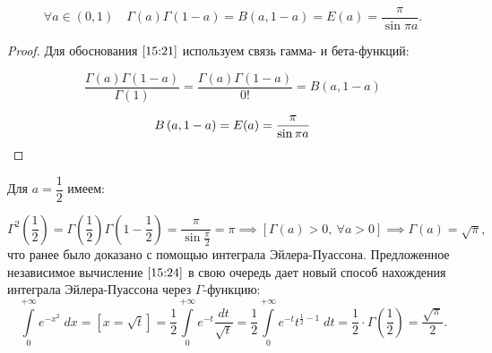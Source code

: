 \documentclass[../../main.tex]{subfiles}
\begin{document}
	
\begin{corollary*}
	\begin{equation}
	\label{15:21}
	\forall a \in (0,1) \quad \Gamma(a)\Gamma \left( 1-a\right)  = B\left( a,1-a\right) = E(a) = \frac{\pi}{\sin{\pi a}}.
	\end{equation}
\end{corollary*}


\begin{proof}
	Для обоснования $\eqref{15:21}$ используем связь гамма- и бета-функций:
	
	\begin{equation}
	\label{15:22}
	\frac{\Gamma \left( a\right)\Gamma \left( 1-a\right)}{\Gamma \left( 1\right)} = \frac{\Gamma \left( a\right)\Gamma \left( 1-a\right)}{0!} = B \left( a,1-a\right)
	\end{equation}
	
	\begin{equation}
	\label{15:23}
	B \left( a,1-a\right) = E(a) = \frac{\pi}{\sin{\pi a}}
	\qedhere
	\end{equation}
\end{proof}	

Для $a = \dfrac{1}{2}$ имеем:

\begin{equation}
\label{15:24}
\Gamma^2 \left( \frac{1}{2} \right) = \Gamma \left( \frac{1}{2} \right) \Gamma \left( 1-\frac{1}{2} \right) = \frac{\pi}{\sin{\frac{\pi}{2}}} = \pi \implies \left[ \Gamma(a) > 0,\ \forall a > 0\right] \implies \Gamma(a) = \sqrt{\pi},
\end{equation}
что ранее было доказано с помощью интеграла Эйлера-Пуассона. Предложенное независимое вычисление $\eqref{15:24}$ в свою очередь дает новый способ нахождения интеграла Эйлера-Пуассона через $\Gamma$-функцию:
\[  \int\limits_{0}^{+\infty} e^{-x^2} \; dx = \left[ x = \sqrt{t} \right] =  \frac{1}{2} \int\limits_{0}^{+\infty} e^{-t} \frac{dt}{\sqrt{t}} = \frac{1}{2} \int\limits_{0}^{+\infty} e^{-t} t^{\frac{1}{2} - 1} \; dt = \frac{1}{2} \cdot \Gamma\left( \frac{1}{2} \right) = \frac{\sqrt{\pi}}{2}. \]
\end{document}
